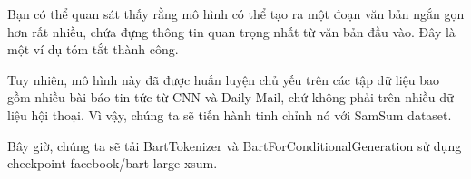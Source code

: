 \pagebreak
Bạn có thể quan sát thấy rằng mô hình có thể tạo ra một đoạn văn bản ngắn gọn hơn rất nhiều, chứa đựng thông tin quan trọng nhất từ văn bản đầu vào. Đây là một ví dụ tóm tắt thành công.

Tuy nhiên, mô hình này đã được huấn luyện chủ yếu trên các tập dữ liệu bao gồm nhiều bài báo tin tức từ CNN và Daily Mail, chứ không phải trên nhiều dữ liệu hội thoại. Vì vậy, chúng ta sẽ tiến hành tinh chỉnh nó với SamSum dataset.
    
Bây giờ, chúng ta sẽ tải BartTokenizer và BartForConditionalGeneration sử dụng checkpoint facebook/bart-large-xsum.\\
